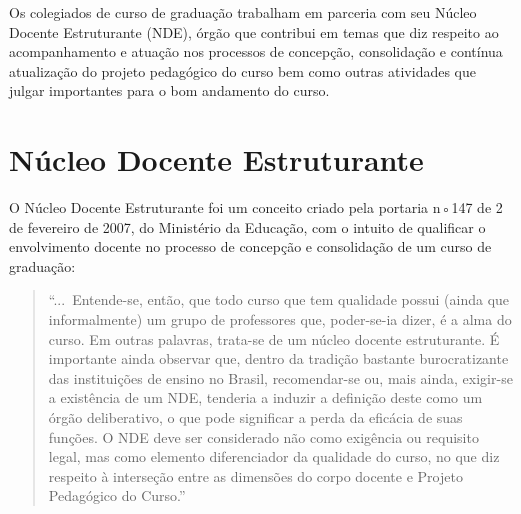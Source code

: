 \documentclass[
	12pt,				%
	openright,			%
	oneside,			%
	a4paper,			%
	english,			%
	brazil				%
	]{abntex2}
\begin{document}




Os colegiados de curso de graduação trabalham em parceria com seu Núcleo Docente Estruturante (NDE), órgão que contribui em temas que diz respeito ao acompanhamento e atuação nos processos de concepção, consolidação e contínua atualização do projeto pedagógico do curso bem como outras atividades que julgar importantes para o bom andamento do curso.

\section{Núcleo Docente Estruturante}
%
O Núcleo Docente Estruturante foi um conceito criado pela portaria n◦147 de 2 de fevereiro de 2007, do Ministério da Educação, com o intuito de qualificar o envolvimento docente no processo de concepção e consolidação de um curso de graduação:

\begin{quotation}
    ``...~Entende-se, então, que todo curso que tem qualidade possui (ainda que informalmente) um grupo de professores que, poder-se-ia dizer, é a alma do curso. Em outras palavras, trata-se de um núcleo docente estruturante. É importante ainda observar que, dentro da tradição bastante burocratizante das instituições de ensino no Brasil, recomendar-se ou, mais ainda, exigir-se a existência de um NDE, tenderia a induzir a definição deste como um órgão deliberativo, o que pode significar a perda da eficácia de suas funções. O NDE deve ser considerado não como exigência ou requisito legal, mas como elemento diferenciador da qualidade do curso, no que diz respeito à interseção entre as dimensões do corpo docente e Projeto Pedagógico do Curso.''
\end{quotation}
\end{document}
